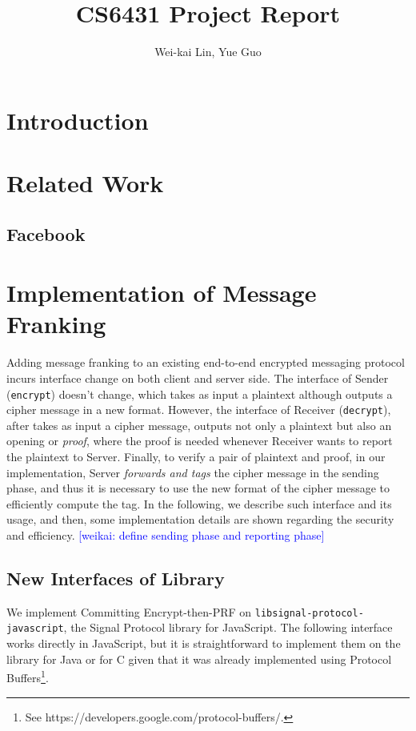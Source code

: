 \documentclass{article}
\title{CS6431 Project Report}
\author{Wei-kai Lin, Yue Guo}
\newcommand{\weikai}[1]{\textcolor{blue}{[weikai: #1]}}
\begin{document}
\maketitle

\begin{abstract}
    
\end{abstract}

\section{Introduction}

\section{Related Work}
\subsection{Facebook}


\section{Implementation of Message Franking}

Adding message franking to an existing end-to-end encrypted
messaging protocol incurs interface change on both client and server side.
The interface of Sender ({\tt encrypt}) doesn't change,
which takes as input a plaintext
although outputs a cipher message in a new format.
However, the interface of Receiver ({\tt decrypt}),
after takes as input a cipher message,
outputs not only a plaintext but also an opening or \emph{proof},
where the proof is needed 
whenever Receiver wants to report the plaintext to Server.
Finally, to verify a pair of plaintext and proof,
in our implementation,
Server \emph{forwards and tags} the cipher message in the sending phase,
and thus it is necessary to use the new format of the cipher message
to efficiently compute the tag.
In the following, we describe such interface and its usage,
and then, some implementation details are shown 
regarding the security and efficiency.
\weikai{define sending phase and reporting phase}

\subsection{New Interfaces of Library}

We implement Committing Encrypt-then-PRF on {\tt libsignal-protocol-javascript},
the Signal Protocol library for JavaScript.
The following interface works directly in JavaScript,
but it is straightforward to 
implement them on the library for Java or for C
given that it was already implemented using Protocol Buffers\footnote{
See https://developers.google.com/protocol-buffers/.
}.
\end{document}
